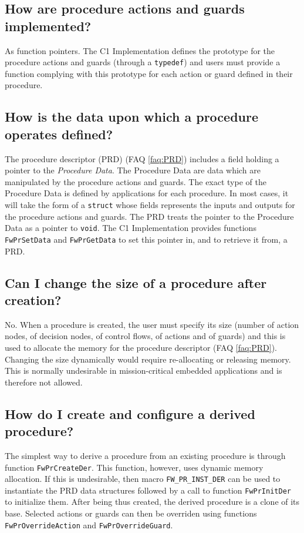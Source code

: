 \documentclass[a4paper,10pt]{article}
\begin{document}
\subsection{How are procedure actions and guards implemented?}
As function pointers. The C1 Implementation defines the prototype for the procedure actions and guards (through a \texttt{typedef}) and users must provide 
a function complying with this prototype for each action or guard defined in their procedure.  

\subsection{How is the data upon which a procedure operates defined?}\label{faq:procedure_data}
The procedure descriptor (PRD) (FAQ \ref{faq:PRD}) includes a field holding a pointer to the \emph{Procedure Data}. The Procedure Data are data which are manipulated 
by the procedure actions and guards. The exact type of the Procedure Data is defined by applications for each procedure. In most cases, it will take 
the form of a \texttt{struct} whose fields represents the inputs and outputs for the procedure actions and guards. The PRD treats the pointer to 
the Procedure Data as a pointer to \texttt{void}. The C1 Implementation provides functions \texttt{FwPrSetData} and \texttt{FwPrGetData} to set 
this pointer in, and to retrieve it from, a PRD.

\subsection{Can I change the size of a procedure after creation?}
No. When a procedure is created, the user must specify its size (number of action nodes, of decision nodes, of control flows, of actions and of guards) 
and this is used to allocate the memory for the procedure descriptor (FAQ \ref{faq:PRD}). Changing the size dynamically would require re-allocating or 
releasing memory. This is normally undesirable in mission-critical embedded applications and is therefore not allowed. 

\subsection{How do I create and configure a derived procedure?}
The simplest way to derive a procedure from an existing procedure is through function \texttt{FwPrCreateDer}. This function, however, 
uses dynamic memory allocation. If this is undesirable, then macro \texttt{FW\_PR\_INST\_DER} can be used to instantiate the PRD data structures 
followed by a call to function \texttt{FwPrInitDer} to initialize them. After being thus created, the derived procedure is a clone of its base. 
Selected actions or guards can then be overriden using functions \texttt{FwPrOverrideAction} and \texttt{FwPrOverrideGuard}.
\end{document}

